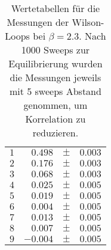 \begin{table}[htbp]
\begin{tabular}{crcl}
\hline
$1$ &	$0.498$ & 	 $\pm$ & 	 $0.003$\\
$2$ &	$0.176$ & 	 $\pm$ & 	 $0.003$\\
$3$ &	$0.068$ & 	 $\pm$ & 	 $0.003$\\
$4$ &	$0.025$ & 	 $\pm$ & 	 $0.005$\\
$5$ &	$0.019$ & 	 $\pm$ & 	 $0.005$\\
$6$ &	$0.004$ & 	 $\pm$ & 	 $0.005$\\
$7$ &	$0.013$ & 	 $\pm$ & 	 $0.005$\\
$8$ &	$0.007$ & 	 $\pm$ & 	 $0.005$\\
$9$ &	$-0.004$ & 	 $\pm$ & 	 $0.005$\\
\hline
\end{tabular}
    \caption{Wertetabellen für die Messungen der Wilson-Loops bei $\beta = 2.3$.
    Nach 1000 Sweeps zur Equilibrierung wurden die Messungen jeweils mit 5 sweeps
    Abstand genommen, um Korrelation zu reduzieren.}
    \label{tab:wilsonBeta23a}
\end{table}

